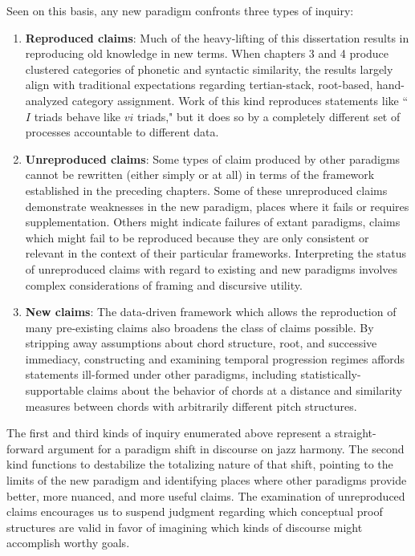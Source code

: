 Seen on this basis, any new paradigm confronts three types of inquiry:
\begin{enumerate}
	\item \textbf{Reproduced claims}: Much of the heavy-lifting of this dissertation results in reproducing old knowledge in new terms.  When chapters 3 and 4 produce clustered categories of phonetic and syntactic similarity, the results largely align with traditional expectations regarding tertian-stack, root-based, hand-analyzed category assignment.  Work of this kind reproduces statements like ``$I$ triads behave like $vi$ triads," but it does so by a completely different set of processes accountable to different data.
	\item \textbf{Unreproduced claims}: Some types of claim produced by other paradigms cannot be rewritten (either simply or at all) in terms of the framework established in the preceding chapters.  Some of these unreproduced claims demonstrate weaknesses in the new paradigm, places where it fails or requires supplementation.  Others might indicate failures of extant paradigms, claims which might fail to be reproduced because they are only consistent or relevant in the context of their particular frameworks.  Interpreting the status of unreproduced claims with regard to existing and new paradigms involves complex considerations of framing and discursive utility.
	\item \textbf{New claims}: The data-driven framework which allows the reproduction of many pre-existing claims also broadens the class of claims possible.  By stripping away assumptions about chord structure, root, and successive immediacy, constructing and examining temporal progression regimes affords statements ill-formed under other paradigms, including statistically-supportable claims about the behavior of chords at a distance and similarity measures between chords with arbitrarily different pitch structures.
\end{enumerate}
The first and third kinds of inquiry enumerated above represent a straight-forward argument for a paradigm shift in discourse on jazz harmony.  The second kind functions to destabilize the totalizing nature of that shift, pointing to the limits of the new paradigm and identifying places where other paradigms provide better, more nuanced, and more useful claims.  The examination of unreproduced claims encourages us to suspend judgment regarding which conceptual proof structures are valid in favor of imagining which kinds of discourse might accomplish worthy goals.

